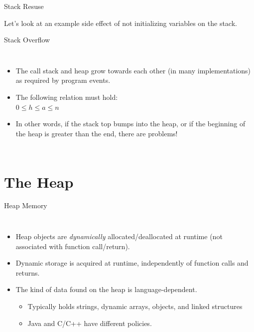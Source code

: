 \documentclass[14pt,aspectratio=1610]{beamer}
\begin{document}
\begin{frame}{Stack Resuse}
  \begin{center}\Large
  Let's look at an example side effect of not initializing variables on the stack.
\end{center}
\end{frame}


\begin{frame}{Stack Overflow}
\begin{columns}

  \begin{itemize}
  \item
    The call stack and heap grow towards each other (in many implementations) as required by program events.
  \item
    The following relation must hold:\\
    \(0 \le h \le a \le n\)
  \item
    In other words, if the stack top bumps into the heap, or if the beginning of the heap is greater than the end, there are problems!
  \end{itemize}

  
\end{columns}

\end{frame}

\section{The Heap}

\begin{frame}{Heap Memory}
\begin{columns}[b]
  \begin{itemize}[<+->]
  \item
    Heap objects are \textit{dynamically} allocated/deallocated at runtime
    (not associated with function call/return).
  \item
    Dynamic storage is acquired at runtime, independently of function calls and
  returns.
  \item
    The kind of data found on the heap is language-dependent.

    \begin{itemize}
    \item
      Typically holds strings, dynamic arrays, objects, and linked structures
    \item
      Java and C/C++ have different policies.
    \end{itemize}
  \end{itemize}
  \vspace{1.5em}
  
\end{columns}
\end{frame}
\end{document}
